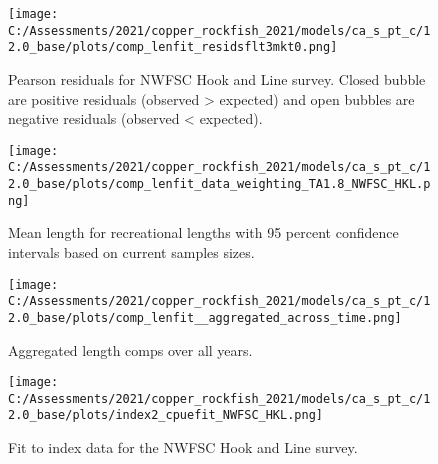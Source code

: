 \documentclass[11pt,
  english,
  a4paper,
]{article}
\begin{document}
\begin{figure}
\centering
\texttt{[image: C:/Assessments/2021/copper\_rockfish\_2021/models/ca\_s\_pt\_c/12.0\_base/plots/comp\_lenfit\_residsflt3mkt0.png]}
\caption{Pearson residuals for NWFSC Hook and Line survey. Closed bubble are positive residuals (observed \textgreater{} expected) and open bubbles are negative residuals (observed \textless{} expected).\label{fig:hkl-pearson}}
\end{figure}

\tagmcend\tagstructend


\begin{figure}
\centering
\texttt{[image: C:/Assessments/2021/copper\_rockfish\_2021/models/ca\_s\_pt\_c/12.0\_base/plots/comp\_lenfit\_data\_weighting\_TA1.8\_NWFSC\_HKL.png]}
\caption{Mean length for recreational lengths with 95 percent confidence intervals based on current samples sizes.\label{fig:hkl-mean-len-fit}}
\end{figure}

\tagmcend\tagstructend


\begin{figure}
\centering
\texttt{[image: C:/Assessments/2021/copper\_rockfish\_2021/models/ca\_s\_pt\_c/12.0\_base/plots/comp\_lenfit\_\_aggregated\_across\_time.png]}
\caption{Aggregated length comps over all years.\label{fig:agg-len-fit}}
\end{figure}

\tagmcend\tagstructend


\begin{figure}
\centering
\texttt{[image: C:/Assessments/2021/copper\_rockfish\_2021/models/ca\_s\_pt\_c/12.0\_base/plots/index2\_cpuefit\_NWFSC\_HKL.png]}
\caption{Fit to index data for the NWFSC Hook and Line survey.\label{fig:index-fit}}
\end{figure}

\tagmcend\tagstructend
\end{document}
